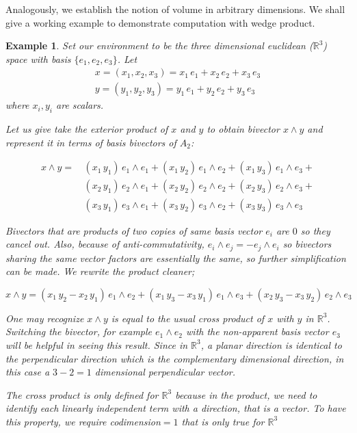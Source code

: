 \documentclass[12pt]{article}
\newtheorem{example}[theorem]{Example}
\numberwithin{theorem}{section}
\numberwithin{equation}{theorem}
\begin{document}
Analogously, we establish the notion of volume in arbitrary dimensions.
We shall give a working example to demonstrate computation with wedge product.
\begin{example}
    Set our environment to be the three dimensional euclidean ($\mathbb{R}^3$) space with basis $\{e_1, e_2, e_3\}$. Let 
    \begin{gather*}
        x = (x_1, x_2, x_3) = x_1\,e_1 + x_2\,e_2 + x_3\,e_3\\
        y = (y_1, y_2, y_3) = y_1\,e_1 + y_2\,e_2 + y_3\,e_3
    \end{gather*}
    where $x_i, y_i$ are scalars.

    Let us give take the exterior product of $x$ and $y$ to obtain bivector $x \wedge y$ and represent it in terms of basis bivectors of $A_2$:

    \begin{align*}
    x \wedge y = \, &(x_1\,y_1)\,e_1 \wedge e_1 + (x_1\,y_2)\,e_1 \wedge e_2 + (x_1\,y_3)\,e_1 \wedge e_3 + \\ &(x_2\,y_1)\,e_2 \wedge e_1 + 
    (x_2\,y_2)\,e_2 \wedge e_2 + 
    (x_2\,y_3)\,e_2 \wedge e_3 + \\
    &(x_3\,y_1)\,e_3 \wedge e_1 + 
    (x_3\,y_2)\,e_3 \wedge e_2 + 
    (x_3\,y_3)\,e_3 \wedge e_3    
    \end{align*}

    Bivectors that are products of two copies of same basis vector $e_i$ are $0$ so they cancel out. Also, because of anti-commutativity, $e_i \wedge e_j = -e_j \wedge e_i$ so bivectors sharing the same vector factors are essentially the same, so further simplification can be made. We rewrite the product cleaner;

    $$x \wedge y = (x_1\,y_2 - x_2\,y_1)\,e_1 \wedge e_2 + (x_1\,y_3 - x_3\,y_1)\,e_1 \wedge e_3 + (x_2\,y_3 - x_3\,y_2)\,e_2 \wedge e_3$$

    One may recognize $x \wedge y$ is equal to the usual cross product of $x$ with $y$ in $\mathbb{R}^3$. Switching the bivector, for example $e_1 \wedge e_2$ with the non-apparent basis vector $e_3$ will be helpful in seeing this result. Since in $\mathbb{R}^3$, a planar direction is identical to the perpendicular direction which is the complementary dimensional direction, in this case a $3-2 = 1$ dimensional perpendicular vector.

    The cross product is only defined for $\mathbb{R}^3$ because in the product, we need to identify each linearly independent term with a direction, that is a vector. To have this property, we require codimension$ = 1$ that is only true for $\mathbb{R}^3$
    {\color{blue}}
\end{example}
\end{document}
